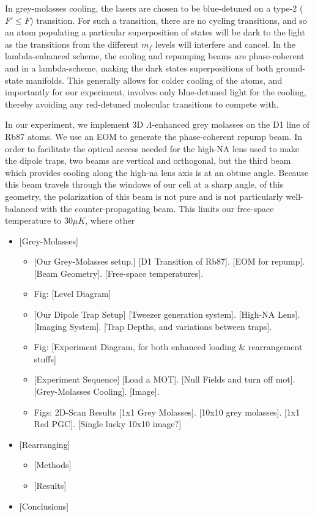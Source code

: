 \documentclass[aps,prl,amsmath,amssymb,groupedaddress,10pt,superscriptaddress,floatfix,twocolumn,showkeys,longbibliography]{revtex4-1} %
\begin{document}
In grey-molasses cooling, the lasers are chosen to be blue-detuned on a type-2 ($F' \le F$) transition. For such a transition, there are no cycling transitions, and so an atom populating a particular superposition of states will be dark to the light as the transitions from the different $m_f$ levels will interfere and cancel. In the lambda-enhanced scheme, the cooling and repumping beams are phase-coherent and in a lambda-scheme, making the dark states superpositions of both ground-state manifolds. This generally allows for colder cooling of the atoms, and importantly for our experiment, involves only blue-detuned light for the cooling, thereby avoiding any red-detuned molecular transitions to compete with.

In our experiment, we implement 3D $\Lambda$-enhanced grey molasses on the D1 line of Rb87 atoms. We use an EOM to generate the phase-coherent repump beam. In order to facilitate the optical access needed for the high-NA lens used to make the dipole traps, two beams are vertical and orthogonal, but the third beam which provides cooling along the high-na lens axis is at an obtuse angle. Because this beam travels through the windows of our cell at a sharp angle, of this geometry, the polarization of this beam is not pure and is not particularly well-balanced with the counter-propagating beam. This limits our free-space temperature to $30\mu K$, where other

\begin{itemize}
\item{[Grey-Molasses]}
    \begin{itemize}    
    \item{[Our Grey-Molasses setup.]}
        [D1 Transition of Rb87]. [EOM for repump]. [Beam Geometry]. [Free-space temperatures].
    \item{Fig: [Level Diagram]}
    \item{[Our Dipole Trap Setup]}
        [Tweezer generation system]. [High-NA Lens].  [Imaging System].  [Trap Depths, and variations between traps].
    \item{Fig: [Experiment Diagram, for both enhanced loading \& rearrangement stuffs]}
    
    \item{[Experiment Sequence]}
        [Load a MOT]. [Null Fields and turn off mot]. [Grey-Molasses Cooling]. [Image].
    
    \item{Figs: 2D-Scan Results}
        [1x1 Grey Molasses]. [10x10 grey molasses]. [1x1 Red PGC]. [Single lucky 10x10 image?]
    \end{itemize}
\item{[Rearranging]}
    \begin{itemize}
    \item{[Methods]}
    \item{[Results]}
    \end{itemize}
\item{[Conclusions]}

\end{itemize}
\end{document}
